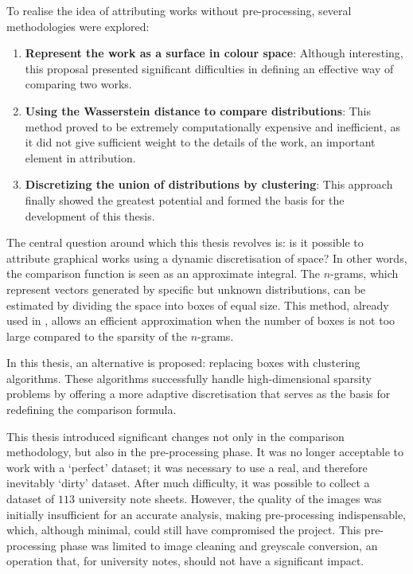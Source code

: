 \begin{toReview}
		\bigskip \noindent To realise the idea of attributing works without pre-processing, several methodologies were explored:

		\begin{enumerate}
			\item \textbf{Represent the work as a surface in colour space}: Although interesting, this proposal presented significant difficulties in defining an effective way of comparing two works.
			\item \textbf{Using the Wasserstein distance to compare distributions}: This method proved to be extremely computationally expensive and inefficient, as it did not give sufficient weight to the details of the work, an important element in attribution.
			\item \textbf{Discretizing the union of distributions by clustering}: This approach finally showed the greatest potential and formed the basis for the development of this thesis.
		\end{enumerate}

		\noindent The central question around which this thesis revolves is: is it possible to attribute graphical works using a dynamic discretisation of space? In other words, the comparison function is seen as an approximate integral. The $n$-grams, which represent vectors generated by specific but unknown distributions, can be estimated by dividing the space into boxes of equal size. This method, already used in \cite{thesis}, allows an efficient approximation when the number of boxes is not too large compared to the sparsity of the $n$-grams.

		\noindent In this thesis, an alternative is proposed: replacing boxes with clustering algorithms. These algorithms successfully handle high-dimensional sparsity problems by offering a more adaptive discretisation that serves as the basis for redefining the comparison formula.

		\bigskip \noindent This thesis introduced significant changes not only in the comparison methodology, but also in the pre-processing phase. It was no longer acceptable to work with a ‘perfect’ dataset; it was necessary to use a real, and therefore inevitably ‘dirty’ dataset. After much difficulty, it was possible to collect a dataset of $113$ university note sheets. However, the quality of the images was initially insufficient for an accurate analysis, making pre-processing indispensable, which, although minimal, could still have compromised the project. This pre-processing phase was limited to image cleaning and greyscale conversion, an operation that, for university notes, should not have a significant impact.


\end{toReview}
